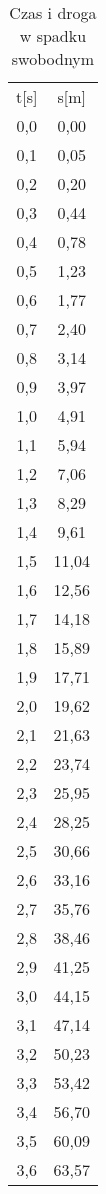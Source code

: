 \documentclass{article}
\begin{document}
\begin{center}
\begin{longtable}{|c|c|}
\caption{Czas i droga w spadku swobodnym} \\

\hline
t{[}s{]} & s{[}m{]} \\
0,0      & 0,00     \\
0,1      & 0,05     \\
0,2      & 0,20     \\
0,3      & 0,44     \\
0,4      & 0,78     \\
0,5      & 1,23     \\
0,6      & 1,77     \\
0,7      & 2,40     \\
0,8      & 3,14     \\
0,9      & 3,97     \\
1,0      & 4,91     \\
1,1      & 5,94     \\
1,2      & 7,06     \\
1,3      & 8,29     \\
1,4      & 9,61     \\
1,5      & 11,04    \\
1,6      & 12,56    \\
1,7      & 14,18    \\
1,8      & 15,89    \\
1,9      & 17,71    \\
2,0      & 19,62    \\
2,1      & 21,63    \\
2,2      & 23,74    \\
2,3      & 25,95    \\
2,4      & 28,25    \\
2,5      & 30,66    \\
2,6      & 33,16    \\
2,7      & 35,76    \\
2,8      & 38,46    \\
2,9      & 41,25    \\
3,0      & 44,15    \\
3,1      & 47,14    \\
3,2      & 50,23    \\
3,3      & 53,42    \\
3,4      & 56,70    \\
3,5      & 60,09    \\
3,6      & 63,57    \\

\end{longtable}
\end{center}
\end{document}
